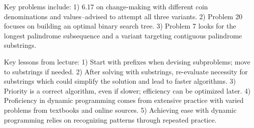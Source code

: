 Key problems include:
1) 6.17 on change-making with different coin denominations and values--advised to attempt all three variants.
2) Problem 20 focuses on building an optimal binary search tree.
3) Problem 7 looks for the longest palindrome subsequence and a variant targeting contiguous palindrome substrings.

Key lessons from lecture:
1) Start with prefixes when devising subproblems; move to substrings if needed.
2) After solving with substrings, re-evaluate necessity for substrings which could simplify the solution and lead to faster algorithms.
3) Priority is a correct algorithm, even if slower; efficiency can be optimized later.
4) Proficiency in dynamic programming comes from extensive practice with varied problems from textbooks and online sources.
5) Achieving ease with dynamic programming relies on recognizing patterns through repeated practice.
